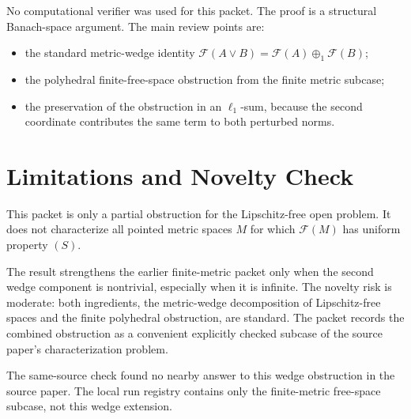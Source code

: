 \documentclass[11pt]{article}
\newcommand{\Free}{\mathcal F}
\begin{document}
No computational verifier was used for this packet. The proof is a
structural Banach-space argument. The main review points are:

\begin{itemize}
\item the standard metric-wedge identity
  $\Free(A\vee B)=\Free(A)\oplus_1\Free(B)$;
\item the polyhedral finite-free-space obstruction from the finite metric
  subcase;
\item the preservation of the obstruction in an $\ell_1$-sum, because the
  second coordinate contributes the same term to both perturbed norms.
\end{itemize}

\section*{Limitations and Novelty Check}

This packet is only a partial obstruction for the Lipschitz-free open
problem. It does not characterize all pointed metric spaces $M$ for which
$\Free(M)$ has uniform property $(S)$.

The result strengthens the earlier finite-metric packet only when the
second wedge component is nontrivial, especially when it is infinite.
The novelty risk is moderate: both ingredients, the metric-wedge
decomposition of Lipschitz-free spaces and the finite polyhedral
obstruction, are standard. The packet records the combined obstruction as
a convenient explicitly checked subcase of the source paper's
characterization problem.

The same-source check found no nearby answer to this wedge obstruction in
the source paper. The local run registry contains only the finite-metric
free-space subcase, not this wedge extension.
\end{document}
